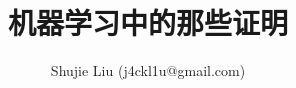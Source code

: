 \documentclass[12pt,a4paper,titlepage]{book}
\title{机器学习中的那些证明}
\author{Shujie Liu (j4ckl1u@gmail.com)}
\begin{document}
\begin{CJK*}{UTF8}{gbsn} 
\maketitle

\tableofcontents
\newpage














\end{CJK*}
\end{document}

